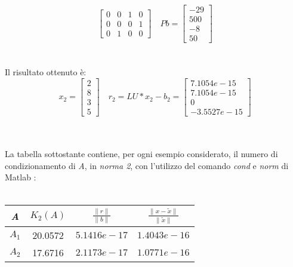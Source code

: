 \begin{description}
\[\begin{bmatrix}
			0 & 0 & 1 & 0 \\
			0 & 0 & 0 & 1 \\
			0 & 1 & 0 & 0 
		\end{bmatrix} \quad
		Pb =\begin{bmatrix}
			-29 \\
			500 \\
			-8  \\
			50               
		\end{bmatrix}
		\]\\\\
	Il risultato ottenuto è:\\
		\[
		x_2 =\begin{bmatrix}
			2 \\
		  	8 \\
		  	3 \\
		  	5 
		\end{bmatrix} \quad
		r_2 = LU*x_2-b_2 =\begin{bmatrix}
			7.1054e-15 \\
		  	7.1054e-15 \\
		  	0 \\
		  	-3.5527e-15 
		\end{bmatrix}
		\]\\\\
\end{description}
La tabella sottostante contiene, per ogni esempio considerato, il numero di condizionamento di \textit{A}, in \textit{norma 2}, con l'utilizzo del comando \textit{cond} e \textit{norm} di Matlab :\\\
\begin{center}
	\begin{tabular}{ | c | c | c | c | }
		\hline
			\textit{A} & $K_2(A)$ & $\frac{\|r\|}{\|b\|}$ & $\frac{\|x-\tilde{x}\|}{\|\tilde{x}\|}$ \\
		\hline
			$A_1$ & 20.0572 & $5.1416e-17$ & $1.4043e-16$ \\
			$A_2$ &	17.6716 & $2.1173e-17$ & $1.0771e-16$ \\
		\hline
	\end{tabular}
\end{center}